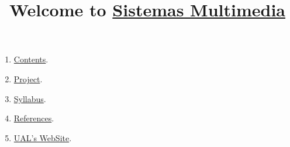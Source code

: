 
%
\title{Welcome to \href{https://github.com/Sistemas-Multimedia}{Sistemas Multimedia}}

\maketitle

\begin{enumerate}
\item \href{https://sistemas-multimedia.github.io/contents}{Contents}.
\item \href{https://github.com/Sistemas-Multimedia/VCF}{Project}.
\item \href{https://sistemas-multimedia.github.io/syllabus}{Syllabus}.
\item \href{https://sistemas-multimedia.github.io/references}{References}.
\item \href{https://www.ual.es/estudios/masteres/presentacion/plandeestudios/asignatura/7114/71142105}{UAL's WebSite}.
\end{enumerate}
